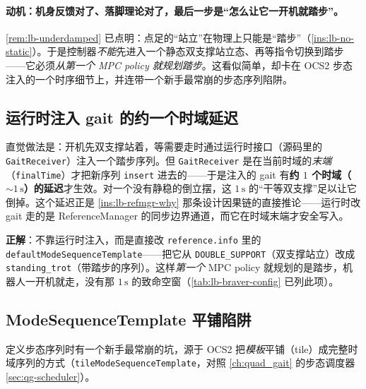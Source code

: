 \paragraph{动机：机身反馈对了、落脚理论对了，最后一步是“怎么让它一开机就踏步”。}
\cref{rem:lb-underdamped} 已点明：点足的“站立”在物理上只能是“踏步”（\cref{ins:lb-no-static}）。于是控制器\emph{不能}先进入一个静态双支撑站立态、再等指令切换到踏步——它必须\emph{从第一个 MPC policy 就规划踏步}。这看似简单，却卡在 OCS2 步态注入的一个时序细节上，并连带一个新手最常崩的步态序列陷阱。

\subsection{运行时注入 gait 的约一个时域延迟}
\label{subsec:lb-gait-delay}

直觉做法是：开机先双支撑站着，等需要走时通过运行时接口（源码里的 \texttt{GaitReceiver}）注入一个踏步序列。但 \texttt{GaitReceiver} 是在当前时域的\emph{末端}（\texttt{finalTime}）才把新序列 \texttt{insert} 进去的——于是注入的 gait 有\textbf{约 $1$ 个时域（$\sim 1\,\mathrm{s}$）的延迟}才生效。对一个没有静稳的倒立摆，这 $1\,\mathrm{s}$ 的“干等双支撑”足以让它倒掉。这个延迟正是 \cref{ins:lb-refmgr-why} 那条设计因果链的直接推论——运行时改 gait 走的是 ReferenceManager 的同步边界通道，而它在时域末端才安全写入。

\textbf{正解}：不靠运行时注入，而是直接改 \texttt{reference.info} 里的 \texttt{defaultModeSequenceTemplate}——把它从 \texttt{DOUBLE\_SUPPORT}（双支撑站立）改成 \texttt{standing\_trot}（带踏步的序列）。这样\emph{第一个} MPC policy 就规划的是踏步，机器人一开机就走，没有那 $1\,\mathrm{s}$ 的致命空窗（\cref{tab:lb-braver-config} 已列此项）。

\subsection{ModeSequenceTemplate 平铺陷阱}
\label{subsec:lb-tile-trap}

定义步态序列时有一个新手最常崩的坑，源于 OCS2 把\emph{模板}平铺（tile）成完整时域序列的方式（\texttt{tileModeSequenceTemplate}，对照 \cref{ch:quad_gait} 的步态调度器 \cref{sec:qg-scheduler}）。

